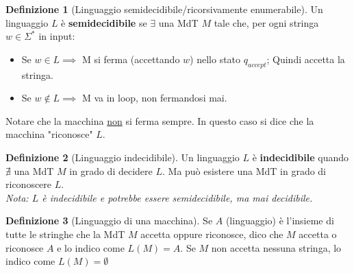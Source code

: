 \documentclass{article}  %
\theoremstyle{definition}
\newtheorem{definition}{Definizione}[section]
\begin{document}
\begin{definition}[Linguaggio semidecidibile/ricorsivamente enumerabile]
	Un linguaggio $L$ è \textbf{semidecidibile} se $\exists$ una MdT $M$ tale che, per ogni stringa $w\in \Sigma^*$ in input:
	\begin{itemize}
		\item Se $w \in L \implies$ M si ferma (accettando $w$) nello stato $q_{accept}$; Quindi accetta la stringa.
		\item Se $w \notin L \implies$ M va in loop, non fermandosi mai.
	\end{itemize}
	Notare che la macchina \underline{non} si ferma sempre. In questo caso si dice che la macchina "riconosce" $L$.
\end{definition}

\begin{definition}[Linguaggio indecidibile]
	Un linguaggio $L$ è \textbf{indecidibile} quando $\nexists$ una MdT $M$ in grado di decidere $L$. Ma può esistere una MdT in grado
	di riconoscere $L$.\\
	\textit{Nota: $L$ è indecidibile e potrebbe essere semidecidibile, ma mai decidibile.}
\end{definition}

\begin{definition}[Linguaggio di una macchina]
	Se $A$ (linguaggio) è l'insieme di tutte le stringhe che la MdT $M$ accetta oppure riconosce, dico che $M$ accetta o riconosce $A$ e lo indico come $L(M)=A$. \newline
	Se $M$ non accetta nessuna stringa, lo indico come $L(M)=\emptyset$
\end{definition}

\break
\end{document}
